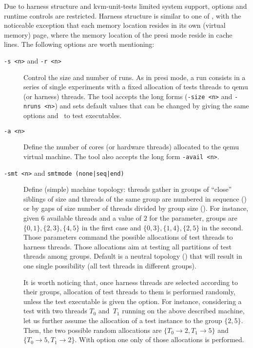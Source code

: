 Due to harness structure and kvm-unit-tests limited system
support, \litmus{} options and runtime controls are restricted. Harness
structure is similar to one of ,
with the noticeable exception that each memory location resides in its
own (virtual memory) page, where the memory location of the presi mode
reside in cache lines. The following options are worth mentioning:
\begin{description}
\item[{\tt -s  <n>} and {\tt -r <n>}] Control the size and number of
runs. As in presi mode, a run consists in a series of single
experiments with a fixed allocation of tests threads to qemu (or harness)
threads. The \litmus{} tool accepts the long forms
({\tt -size  <n>} and {\tt -nruns <n>}) and sets default values that
can be changed by giving the same options  and~
to test executables.

\item[{\tt -a <n>}] Define the number of cores (or hardware threads)
allocated to the qemu virtual machine. The \litmus{} tool also accepts
the long form \texttt{-avail <n>}.

\item[{\tt -smt <n>} and {\tt smtmode (none|seq|end)}]
Define (simple) machine topology: threads gather in groups of
``close'' siblings of size  and threads of the same
group are numbered in sequence () or by gaps of size
number of threads divided by group size (). For instance,
given $6$ available threads and a value of $2$ for the 
parameter, groups are $\{0,1\}, \{2,3\},  \{4,5\}$ in the first case and
$\{0,3\}, \{1,4\}, \{2,5\}$ in the second. Those parameters command
the possible allocations of test threads to harness threads. Those
allocations aim at testing all partitions of test threads among
groups. Default is a neutral topology () that will result
in one  single possibility (all test threads in different groups).

It is worth noticing that, once  harness threads are selected
according to their groups, allocation of test threads to them is
performed randomly, unless the test executable is given the 
option. For instance, considering a test with two threads $T_0$
and~$T_1$ running on the above described machine, let us further
assume the allocation of a test instance to the group $\{2,5\}$.
Then, the two possible random allocations are
$\{ T_0 \rightarrow 2, T_1 \rightarrow 5\}$
and
$\{ T_0 \rightarrow 5, T_1 \rightarrow 2\}$. With option 
one only of those allocations is performed.


\end{description}
